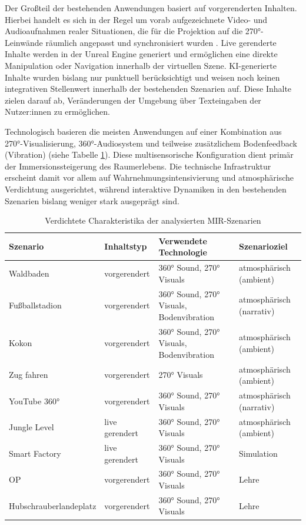Der Großteil der bestehenden Anwendungen basiert auf vorgerenderten Inhalten.
Hierbei handelt es sich in der Regel um vorab aufgezeichnete Video- und Audioaufnahmen realer Situationen, die für die Projektion auf die 270°-Leinwände räumlich angepasst und synchronisiert wurden \parencite{orawetz2024mir}.
Live gerenderte Inhalte werden in der Unreal Engine generiert und ermög\-lichen eine direkte Manipulation oder Navigation innerhalb der virtuellen Szene.
KI-generierte Inhalte wurden bislang nur punktuell berücksichtigt und weisen noch keinen integrativen Stellenwert innerhalb der bestehenden Szenarien auf. Diese Inhalte zielen darauf ab, Veränderungen der Umgebung über Texteingaben der Nutzer:innen zu ermög\-lichen.

Technologisch basieren die meisten Anwendungen auf einer Kombination aus 270°-Visuali\-sierung, 360°-Audiosystem und teilweise zusätzlichem Bodenfeedback (Vibration) (siehe Tabelle \ref{tab:charakteristika}). Diese multisensorische Konfiguration dient primär der Immersionssteigerung des Raumerlebens. Die technische Infrastruktur erscheint damit vor allem auf Wahrnehmungsintensivierung und atmosphärische Verdichtung ausgerichtet, während interaktive Dynamiken in den bestehenden Szenarien bislang weniger stark ausgeprägt sind.


\begin{table}[htbp]
\centering
\small
\caption{Verdichtete Charakteristika der analysierten MIR-Szenarien}
\begin{tabular}{p{4cm} p{3cm} p{5cm} p{3cm}}
\toprule
\textbf{Szenario} & \textbf{Inhaltstyp} & \textbf{Verwendete Technologie} & \textbf{Szenarioziel} \\
\midrule
Waldbaden & vorgerendert & 360° Sound, 270° Visuals & atmosphärisch (ambient) \\
Fußballstadion & vorgerendert & 360° Sound, 270° Visuals, Bodenvibration & atmosphärisch (narrativ) \\
Kokon & vorgerendert & 360° Sound, 270° Visuals, Bodenvibration & atmosphärisch (ambient) \\
Zug fahren & vorgerendert & 270° Visuals & atmosphärisch (ambient) \\
YouTube 360° & vorgerendert & 360° Sound, 270° Visuals & atmosphärisch (narrativ) \\
Jungle Level & live gerendert & 360° Sound, 270° Visuals & atmosphärisch (ambient) \\
Smart Factory & live gerendert & 360° Sound, 270° Visuals & Simulation \\
OP & vorgerendert & 360° Sound, 270° Visuals & Lehre \\
Hubschrauberlandeplatz & vorgerendert & 360° Sound, 270° Visuals & Lehre \\
\bottomrule
\end{tabular}
\label{tab:charakteristika}
\end{table}

